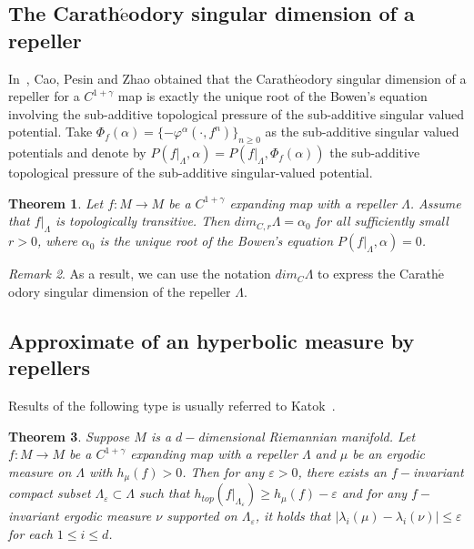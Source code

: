 \documentclass[11pt,a4paper]{amsart}
\theoremstyle{plain}
\newtheorem{Thm}{Theorem}[section]
\theoremstyle{remark}
\newtheorem{Rem}[Thm]{Remark}
\begin{document}
	
	
	\subsection{The Carath$\acute{\text{e}}$odory singular dimension of a repeller}
	In~\cite{caopesinzhao2019}, Cao, Pesin and Zhao obtained that the Carath$\acute{\text{e}}$odory singular dimension of a repeller for a $C^{1+\gamma}$ map is exactly the unique root of the Bowen's equation involving the sub-additive topological pressure of the sub-additive singular valued potential. Take $\Phi_{f}(\alpha)=\{-\varphi^{\alpha}(\cdot,f^{n})\}_{n\geq 0}$ as the sub-additive singular valued potentials and denote by $P(f|_{\Lambda},\alpha)=P(f|_{\Lambda},\Phi_{f}(\alpha))$ the sub-additive topological pressure of the sub-additive singular-valued potential.
	\begin{Thm}\cite{caopesinzhao2019}\label{singular-valued dimension}
		Let $f: M\rightarrow M$ be a $C^{1+\gamma}$ expanding map with a repeller $\Lambda$. Assume that $f|_{\Lambda}$ is topologically transitive. Then $dim_{C,r} \Lambda=\alpha_{0}$ for all sufficiently small $r>0$, where $\alpha_{0}$ is the unique root of the Bowen's equation $P(f|_{\Lambda},\alpha)=0$.
	\end{Thm}
	\begin{Rem}
		As a result, we can use the notation $dim_{C}\Lambda$ to express the Carath$\acute{\text{e}}$odory singular dimension of the repeller $\Lambda$.
	\end{Rem}
	
	
	\subsection{Approximate of an hyperbolic measure by repellers} Results of the following type is usually referred to Katok~\cite{KH}.
	\begin{Thm}\label{approximate}
		Suppose $M$ is a $d-$dimensional Riemannian manifold. Let $f: M\rightarrow M$ be a $C^{1+\gamma}$ expanding map with a repeller $\Lambda$ and $\mu$ be an ergodic measure on $\Lambda$ with $h_{\mu}(f)>0$. Then for any $\varepsilon>0$, there exists an $f-$invariant compact subset $\Lambda_{\varepsilon}\subset\Lambda$ such that $h_{top}(f|_{\Lambda_{\varepsilon}})\geq h_{\mu}(f)-\varepsilon$ and for any $f-$invariant ergodic measure $\nu$ supported on $\Lambda_{\varepsilon}$, it holds that $|\lambda_{i}(\mu)-\lambda_{i}(\nu)|\leq\varepsilon$ for each $1\leq i\leq d$.
	\end{Thm}
	
\end{document}
